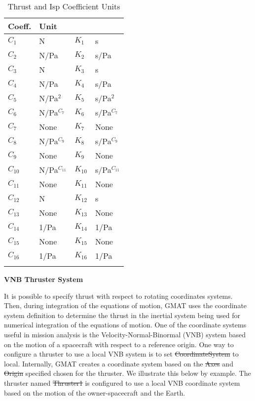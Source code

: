 \begin{table}[h!]
\centering \caption{ Thrust and Isp Coefficient Units }
      \begin{tabular}{llll}
      \hline\hline
         Coeff. & Unit \\
         \hline
         $C_1$ & N & $K_1$ & s \\
         $C_2$ & N/Pa & $K_2$ & s/Pa\\
         $C_3$ & N  & $K_3$ & s  \\
         $C_4$ & N/Pa & $K_4$ & s/Pa \\
         $C_5$ & N/Pa$^2$ & $K_5$ & s/Pa$^2$ \\
         $C_6$ & N/Pa$^{C_7}$ & $K_6$ & s/Pa$^{C_7}$ \\
         $C_7$ & None & $K_7$ & None  \\
         $C_8$ & N/Pa$^{C_9}$ & $K_8$ & s/Pa$^{C_9}$ \\
         $C_9$ & None & $K_9$ & None \\
         $C_{10}$ & N/Pa$^{C_{11}}$  & $K_{10}$ & s/Pa$^{C_{11}}$  \\
         $C_{11}$ & None & $K_{11}$ & None \\
         $C_{12}$ & N & $K_{12}$ & s\\
         $C_{13}$ & None & $K_{13}$ & None \\
         $C_{14}$ & 1/Pa  & $K_{14}$ & 1/Pa  \\
         $C_{15}$ & None & $K_{15}$ & None \\
         $C_{16}$ & 1/Pa & $K_{16}$ & 1/Pa  \\
      \hline\hline
      \label{Table:OE_RigorouslyJ2Inv}
\end{tabular} \normalsize
\end{table}

\textbf{VNB Thruster System}

It is possible to specify thrust with respect to rotating
coordinates systems.  Then, during integration of the equations of
motion, GMAT uses the coordinate system definition to determine the
thrust in the inertial system being used for numerical integration
of the equations of motion.    One of the coordinate systems useful
in mission analysis is the Velocity-Normal-Binormal (VNB) system
based on the motion of a spacecraft with respect to a reference
origin. One way to configure a thruster to use a local VNB system is
to set \st{CoordinateSystem} to local.  Internally, GMAT creates a
coordinate system based on the \st{Axes} and \st{Origin} specified
chosen for the thruster. We illustrate this below by example. The
thruster named \st{Thruster1} is configured to use a local VNB
coordinate system based on the motion of the owner-spacecraft and
the Earth.

